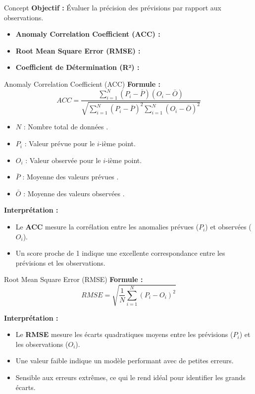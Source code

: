 \begin{frame}{Concept}
  \textbf{Objectif :} Évaluer la précision des prévisions par rapport aux observations.
  \begin{itemize}
    \item \textbf{Anomaly Correlation Coefficient (ACC) :}
    
    \item \textbf{Root Mean Square Error (RMSE) :}
    
    \item \textbf{Coefficient de Détermination (R²) :}
   
  \end{itemize}
\end{frame}
\begin{frame}{Anomaly Correlation Coefficient (ACC)}
  \textbf{Formule :}
  \[
  ACC = \frac{\sum_{i=1}^N (P_i - \bar{P})(O_i - \bar{O})}{\sqrt{\sum_{i=1}^N (P_i - \bar{P})^2 \sum_{i=1}^N (O_i - \bar{O})^2}}
  \]
  \begin{itemize}
  \item \( N \) : Nombre total de données .
  \item \( P_i \) : Valeur prévue pour le \(i\)-ième point.
  \item \( O_i \) : Valeur observée pour le \(i\)-ième point.
  \item \( \bar{P} \) : Moyenne des valeurs prévues .
  \item \( \bar{O} \) : Moyenne des valeurs observées .
  
\end{itemize}

  \textbf{Interprétation :}
  \begin{itemize}
      \item Le \textbf{ACC} mesure la corrélation entre les anomalies prévues (\(P_i\)) et observées (\(O_i\)).

    \item Un score proche de 1 indique une excellente correspondance entre les prévisions et les observations.
  \end{itemize}
\end{frame}
\begin{frame}{Root Mean Square Error (RMSE)}
  \textbf{Formule :}
  \[
  RMSE = \sqrt{\frac{1}{N} \sum_{i=1}^N (P_i - O_i)^2}
  \]

 

  \textbf{Interprétation :}
  \begin{itemize}
    \item Le \textbf{RMSE} mesure les écarts quadratiques moyens entre les prévisions (\(P_i\)) et les observations (\(O_i\)).
    \item Une valeur faible indique un modèle performant avec de petites erreurs.
    \item Sensible aux erreurs extrêmes, ce qui le rend idéal pour identifier les grands écarts.
  \end{itemize}
\end{frame}
